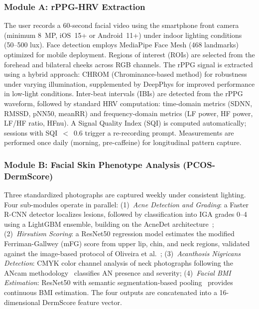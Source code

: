 \documentclass[conference]{IEEEtran}
\begin{document}
\subsubsection{Module A: rPPG-HRV Extraction}
The user records a 60-second facial video using the smartphone front camera (minimum 8~MP, iOS~15+ or Android~11+) under indoor lighting conditions (50--500 lux). Face detection employs MediaPipe Face Mesh (468 landmarks) optimized for mobile deployment. Regions of interest (ROIs) are selected from the forehead and bilateral cheeks across RGB channels. The rPPG signal is extracted using a hybrid approach: CHROM (Chrominance-based method) for robustness under varying illumination, supplemented by DeepPhys for improved performance in low-light conditions. Inter-beat intervals (IBIs) are detected from the rPPG waveform, followed by standard HRV computation: time-domain metrics (SDNN, RMSSD, pNN50, meanRR) and frequency-domain metrics (LF power, HF power, LF/HF ratio, HFnu). A Signal Quality Index (SQI) is computed automatically; sessions with SQI~$<$~0.6 trigger a re-recording prompt. Measurements are performed once daily (morning, pre-caffeine) for longitudinal pattern capture.

\subsubsection{Module B: Facial Skin Phenotype Analysis (PCOS-DermScore)}
Three standardized photographs are captured weekly under consistent lighting. Four sub-modules operate in parallel: (1)~\textit{Acne Detection and Grading}: a Faster R-CNN detector localizes lesions, followed by classification into IGA grades 0--4 using a LightGBM ensemble, building on the AcneDet architecture~\cite{Huynh_2022}; (2)~\textit{Hirsutism Scoring}: a ResNet50 regression model estimates the modified Ferriman-Gallwey (mFG) score from upper lip, chin, and neck regions, validated against the image-based protocol of Oliveira et al.~\cite{Oliveira_2022}; (3)~\textit{Acanthosis Nigricans Detection}: CMYK color channel analysis of neck photographs following the ANcam methodology~\cite{Dhanoo_2024} classifies AN presence and severity; (4)~\textit{Facial BMI Estimation}: ResNet50 with semantic segmentation-based pooling~\cite{Yousaf_2021} provides continuous BMI estimation. The four outputs are concatenated into a 16-dimensional DermScore feature vector.
\end{document}
